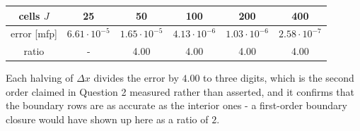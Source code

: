 {\begin{center}
\begin{tabular}{cccccc}
\toprule
cells $J$ & 25 & 50 & 100 & 200 & 400 \\
\midrule
error [mfp] & $6.61\cdot10^{-5}$ & $1.65\cdot10^{-5}$ & $4.13\cdot10^{-6}$ & $1.03\cdot10^{-6}$ & $2.58\cdot10^{-7}$ \\
ratio & - & 4.00 & 4.00 & 4.00 & 4.00 \\
\bottomrule
\end{tabular}
\end{center}

Each halving of $\Delta x$ divides the error by $4.00$ to three digits, which is the second
order claimed in Question 2 measured rather than asserted, and it confirms that the boundary rows are
as accurate as the interior ones - a first-order boundary closure would have shown up here as
a ratio of $2$.
}
